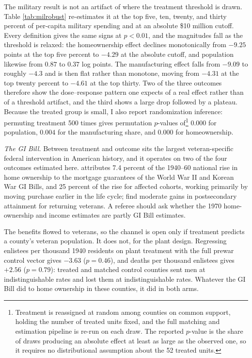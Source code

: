\documentclass[12pt]{article}
\newcommand{\textcite}[1]{\citet{#1}}
\begin{document}
The military result is not an artifact of where the treatment threshold is
drawn. Table \ref{tab:milrobust} re-estimates it at the top five, ten, twenty,
and thirty percent of per-capita military spending and at an absolute
\$10 million cutoff. Every definition gives the same signs at $p<0.01$, and the
magnitudes fall as the threshold is relaxed: the homeownership effect declines
monotonically from $-9.25$ points at the top five percent to $-4.29$ at the
absolute cutoff, and population likewise from $0.87$ to $0.37$ log points. The
manufacturing effect falls from $-9.09$ to roughly $-4.3$ and is then flat rather
than monotone, moving from $-4.31$ at the top twenty percent to $-4.61$ at the
top thirty. Two of the three outcomes therefore show the dose--response pattern
one expects of a real effect rather than of a threshold artifact, and the third
shows a large drop followed by a plateau. Because the treated group is small, I also report randomization
inference: permuting treatment 500 times gives permutation $p$-values of\footnote{Treatment is reassigned at random among counties on common support, holding the number of treated units fixed, and the full matching and estimation pipeline is re-run on each draw. The reported $p$-value is the share of draws producing an absolute effect at least as large as the observed one, so it requires no distributional assumption about the 52 treated units.}
$0.000$ for population, $0.004$ for the manufacturing share, and $0.000$ for
homeownership.

\emph{The GI Bill.} Between treatment and outcome sits the largest
veteran-specific federal intervention in American history, and it operates on
two of the four outcomes estimated here. \textcite{fetter2013} attributes 7.4
percent of the 1940--60 national rise in home ownership to the mortgage
guarantees of the World War II and Korean War GI Bills, and 25 percent of the
rise for affected cohorts, working primarily by moving purchase earlier in the
life cycle; \textcite{boundturner2002} find moderate gains in postsecondary
attainment for returning veterans. A referee should ask whether the 1970
home-ownership and income estimates are partly GI Bill estimates.

The benefits flowed to veterans, so the channel is open only if treatment
predicts a county's veteran population. It does not, for the plant design.
Regressing enlistees per thousand 1940 residents on plant treatment with the
full prewar control vector gives $-3.63$ ($p = 0.46$), and deaths per thousand
enlistees gives $+2.56$ ($p = 0.79$): treated and matched control counties sent
men at indistinguishable rates and lost them at indistinguishable rates. Whatever
the GI Bill did to home ownership in these counties, it did in both arms.
\end{document}
